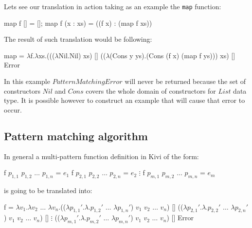 \documentclass[12pt,a4paper]{report}
\begin{document}
Lets see our translation in action taking as an example the \texttt{map}
function:

\vspace*{0.2in}
\begin{code}[style=haskell]
map f [] = [];
map f (x : xs) = ((f x) : (map f xs))
\end{code}

The result of such translation would be following:

\vspace*{0.2in}
\begin{code}[style=haskell,mathescape=true]
map = $\lambda$f.$\lambda$xs.((($\lambda$Nil.Nil) xs) []
              (($\lambda$(Cons y ys).(Cons (f x) (map f ys))) xs) []
              Error
\end{code}

In this example $PatternMatchingError$ will never be returned because the set
of constructors $Nil$ and $Cons$ covers the whole domain of constructors for
$List$ data type. It is possible however to construct an example that will cause
that error to occur.

\subsection{Pattern matching algorithm}
\label{sec:pattern_matching_algorithm}

In general a multi-pattern function definition in Kivi of the form:

\vspace*{0.2in}
\begin{code}[style=haskell,mathescape=true]
f $p_{1,1}$ $p_{1,2}$ $\ldots$ $p_{1,n}$ = $e_{1}$
f $p_{2,1}$ $p_{2,2}$ $\ldots$ $p_{2,n}$ = $e_{2}$
          $\vdots$
f $p_{m,1}$ $p_{m,2}$ $\ldots$ $p_{m,n}$ = $e_{m}$
\end{code}

is going to be translated into:

\vspace*{0.2in}
\begin{code}[style=haskell,mathescape=true]
f = $\lambda v_{1}$.$\lambda v_{2}$ $\ldots$ $\lambda v_{n}$.(($\lambda p_{1,1}'$.$\lambda$.$p_{1,2}'$ $\ldots$ $\lambda p_{1,n}'$) $v_{1}$ $v_{2}$ $\ldots$ $v_{n}$) []
                 (($\lambda p_{2,1}'$.$\lambda$.$p_{2,2}'$ $\ldots$ $\lambda p_{2,n}'$) $v_{1}$ $v_{2}$ $\ldots$ $v_{n}$) []
                                 $\vdots$
                 (($\lambda p_{m,1}'$.$\lambda$.$p_{m,2}'$ $\ldots$ $\lambda p_{m,n}'$) $v_{1}$ $v_{2}$ $\ldots$ $v_{n}$) []
                 Error
\end{code}
\end{document}
